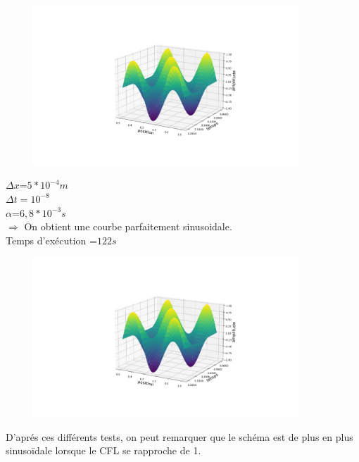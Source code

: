 \begin{enumerate}[label=\alph*)]
\begin{minipage}{.5\textwidth}
\end{minipage}%
\hfill
\begin{minipage}{.45\textwidth}%
\includegraphics[width=12cm,height=6cm]{explicitee.png}

\end{minipage}%

\begin{minipage}{.5\textwidth}%


\item $\Delta x$=$5*{10}^{-4}m$\\
$\Delta t={10}^{-8}$\\
$\alpha$=$6,8*{10}^{-3}s$\\


$\Longrightarrow$ On obtient une courbe parfaitement sinusoidale.\\
Temps d'exécution =$122s$
\end{minipage}%
\hfill
\begin{minipage}{.45\textwidth}%
\includegraphics[width=12cm,height=6cm]{explicitee.png}
\end{minipage}%



\end{enumerate}
D'aprés ces différents tests, on peut remarquer que le schéma est de plus en plus sinusoïdale lorsque le CFL se rapproche de 1.\\



